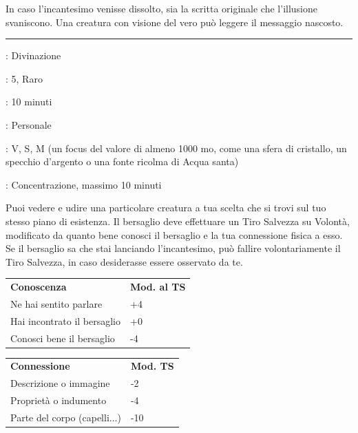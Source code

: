 \begin{multicols}{2}
In caso l'incantesimo venisse dissolto, sia la scritta originale che l'illusione svaniscono. Una creatura con visione del vero può leggere il messaggio nascosto.

\smallskip\noindent\rule{\linewidth}{2pt} \hypertarget{Scrutare}{}\medskip{}
\noindent
\begin{description}[noitemsep, topsep=0pt, parsep=0pt, partopsep=0pt, leftmargin=0cm, labelwidth=2.8cm]
	\item[\textbf{Lista di Magia}]: Divinazione
	\item[\textbf{Livello}]: 5, Raro
	\item[\textbf{T. di Lancio}]: 10 minuti
	\item[\textbf{Gittata}]: Personale
	\item[\textbf{Componenti}]: V, S, M (un focus del valore di almeno 1000 mo, come una sfera di cristallo, un specchio d'argento o una fonte ricolma di Acqua santa)
	\item[\textbf{Durata}]: Concentrazione, massimo 10 minuti
\end{description}

Puoi vedere e udire una particolare creatura a tua scelta che si trovi sul tuo stesso piano di esistenza. Il bersaglio deve effettuare un Tiro Salvezza su Volontà, modificato da quanto bene conosci il bersaglio e la tua connessione fisica a esso. Se il bersaglio sa che stai lanciando l'incantesimo, può fallire volontariamente il Tiro Salvezza, in caso desiderasse essere osservato da
te.

\medskip

\begin{tabular}{ll}
	\toprule
	\textbf{Conoscenza} & \textbf{Mod. al TS}\\
	Ne hai sentito parlare &+4\\
	Hai incontrato il bersaglio &+0\\
	Conosci bene il bersaglio &-4
\end{tabular}

\begin{tabular}{ll}
	\toprule
	\textbf{Connessione} & \textbf{Mod. TS}\\
	Descrizione o immagine &-2\\
	Proprietà o indumento & -4\\
	Parte del corpo (capelli...)&-10
\end{tabular}

\medskip


\end{multicols}
